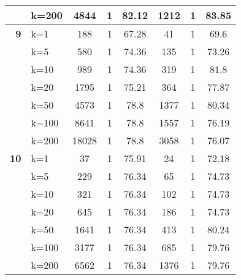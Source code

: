 \begin{table}[htbp]
\begin{tabular}{|l|l|c|c|c|c|c|c|}
     & k=200 & 4844 & 1 & 82.12 & 1212 & 1 & 83.85 \\ \hline
    \multicolumn{1}{|r|}{\textbf{9}} & k=1 & 188 & 1 & 67.28 & 41 & 1 & 69.6 \\ 
     & k=5 & 580 & 1 & 74.36 & 135 & 1 & 73.26 \\ 
     & k=10 & 989 & 1 & 74.36 & 319 & 1 & 81.8 \\ 
     & k=20 & 1795 & 1 & 75.21 & 364 & 1 & 77.87 \\ 
     & k=50 & 4573 & 1 & 78.8 & 1377 & 1 & 80.34 \\ 
     & k=100 & 8641 & 1 & 78.8 & 1557 & 1 & 76.19 \\ 
     & k=200 & 18028 & 1 & 78.8 & 3058 & 1 & 76.07 \\ \hline
    \multicolumn{1}{|r|}{\textbf{10}} & k=1 & 37 & 1 & 75.91 & 24 & 1 & 72.18 \\ 
     & k=5 & 229 & 1 & 76.34 & 65 & 1 & 74.73 \\ 
     & k=10 & 321 & 1 & 76.34 & 102 & 1 & 74.73 \\ 
     & k=20 & 645 & 1 & 76.34 & 186 & 1 & 74.73 \\ 
     & k=50 & 1641 & 1 & 76.34 & 413 & 1 & 80.24 \\ 
     & k=100 & 3177 & 1 & 76.34 & 685 & 1 & 79.76 \\ 
     & k=200 & 6562 & 1 & 76.34 & 1376 & 1 & 79.76 \\ \hline
    \end{tabular}
\end{table}
